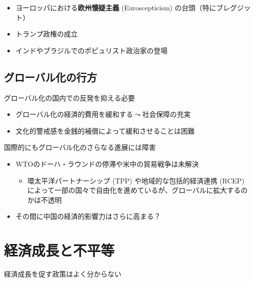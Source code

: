 \documentclass[
  xelatex,
  ja=standard]{bxjsarticle}
\providecommand{\tightlist}{%
  \setlength{\itemsep}{0pt}\setlength{\parskip}{0pt}}\usepackage{longtable,booktabs,array}
\begin{document}
\begin{itemize}
\tightlist
\item
  ヨーロッパにおける\textbf{欧州懐疑主義} (Euroscepticism)
  の台頭（特にブレグジット）
\item
  トランプ政権の成立
\item
  インドやブラジルでのポピュリスト政治家の登場
\end{itemize}

\hypertarget{ux30b0ux30edux30fcux30d0ux30ebux5316ux306eux884cux65b9}{%
\subsection{グローバル化の行方}\label{ux30b0ux30edux30fcux30d0ux30ebux5316ux306eux884cux65b9}}

グローバル化の国内での反発を抑える必要

\begin{itemize}
\tightlist
\item
  グローバル化の経済的費用を緩和する\(\leadsto\)社会保障の充実
\item
  文化的警戒感を金銭的補償によって緩和させることは困難
\end{itemize}

国際的にもグローバル化のさらなる進展には障害

\begin{itemize}
\tightlist
\item
  WTOのドーハ・ラウンドの停滞や米中の貿易戦争は未解決

  \begin{itemize}
  \tightlist
  \item
    環太平洋パートナーシップ (TPP) や地域的な包括的経済連携 (RCEP)
    によって一部の国々で自由化を進めているが、グローバルに拡大するのかは不透明
  \end{itemize}
\item
  その間に中国の経済的影響力はさらに高まる？
\end{itemize}

\hypertarget{ux7d4cux6e08ux6210ux9577ux3068ux4e0dux5e73ux7b49}{%
\section{経済成長と不平等}\label{ux7d4cux6e08ux6210ux9577ux3068ux4e0dux5e73ux7b49}}

経済成長を促す政策はよく分からない\citep{levine1992}
\end{document}

